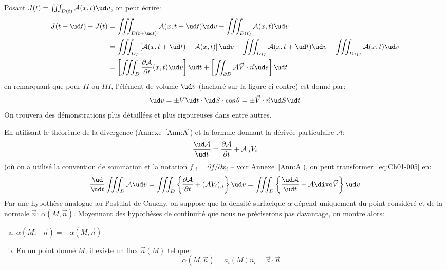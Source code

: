 Posant $J(t)=\iiint_{D(t)} \mathcal{A}(x,t) \ud v$, on peut écrire:
\begin{equation*}
    \begin{aligned}
        J(t+\ud t)-J(t) & =\iiint_{D(t+\ud t)} \mathcal{A}(x,t+\ud t) \ud v-\iiint_{D(t)} \mathcal{A}(x,t) \ud v\\
                        & =\iiint_{D_I} \left[\mathcal{A}(x,t+\ud t)-\mathcal{A}(x,t)\right] \ud v+\iiint_{D_{II}} \mathcal{A}(x,t+\ud t) \ud v-\iiint_{D_{III}} \mathcal{A}(x,t) \ud v\\
                        & =\left[\iiint_{D} \frac{\partial \mathcal{A}}{\partial t}(x,t) \ud v\right]\ud t+ \left[\iint_{\partial D} \mathcal{A}\vec{V}\cdot\vec{n} \ud s\right]\ud t
    \end{aligned}
\end{equation*}
en remarquant que pour $II$ ou $III$, l'élément de volume $\ud v$ (hachuré sur la figure ci-contre) est donné par:
\begin{equation*}
    \ud v=\pm V \ud t \cdot \ud S \cdot \cos\theta = \pm \vec{V}\cdot\vec{n} \ud S \ud t
\end{equation*}
On trouvera des démonstrations plus détaillées et plus rigoureuses dans \cite{Germain-62,Germain-73,Mandel-66,Gontier-69} entre autres.

En utilisant le théorème de la divergence (Annexe~\ref{Ann:A}) et la formule donnant la dérivée particulaire $\mathcal{A}$:
\begin{equation*}
    \frac{\ud \mathcal{A}}{\ud t}=\frac{\partial \mathcal{A}}{\partial t}+\mathcal{A}_{,i}V_i
\end{equation*}
(où on a utilisé la convention de sommation et la notation $f_{,i}=\partial f/\partial x_i$ -- voir Annexe~\ref{Ann:A}), on peut transformer~\eqref{eq:Ch01-005} en:
\begin{equation}
    \frac{\ud}{\ud t}\iiint_{D} \mathcal{A} \ud v=\iiint_{D}\left\{\frac{\partial\mathcal{A}}{\partial t}+(\mathcal{A}V_i)_{,i}\right\} \ud v=\iiint_{D} \left\{\frac{\ud\mathcal{A}}{\ud t}+\mathcal{A}\dive\vec{V}\right\} \ud v
    \label{eq:Ch01-006}
\end{equation}
Par une hypothèse analogue au Postulat de Cauchy, on suppose que la densité surfacique $\alpha$ dépend uniquement du point considéré et de la normale $\vec{n}$: $\alpha(M,\vec{n})$.
Moyennant des hypothèses de continuité que nous ne préciserons pas davantage, on montre alors:

\begin{lem}
    \begin{enumerate}[(a)]
        \item $\alpha(M,-\vec{n}) =-\alpha(M,\vec{n})$
        \item En un point donné $M$, il existe un flux $\vec{a}(M)$ tel que:
        \begin{equation}
            \alpha(M,\vec{n}) =a_i(M)n_i=\vec{a}\cdot\vec{n}
            \label{eq:Ch01-007}
        \end{equation}
    \end{enumerate}
    \label{lem:Ch01-2}
\end{lem}

